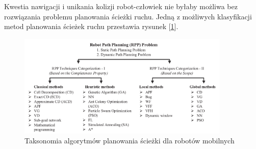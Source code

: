 Kwestia nawigacji i unikania kolizji robot-człowiek nie byłaby możliwa bez rozwiązania problemu planowania ścieżki ruchu. Jedną z możliwych klasyfikacji metod planowania ścieżek ruchu przestawia rysunek [\ref{fig:taxonomy}].

\begin{figure}[H]
	\centering
	\includegraphics[width=0.9\textwidth]{gfx/taksonomia_planery.png}
	\caption{Taksonomia algorytmów planowania ścieżki dla robotów mobilnych\cite{taxonomy}}
	\label{fig:taxonomy}
\end{figure}



